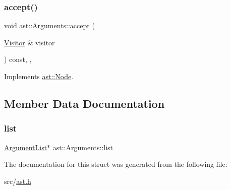 \subsubsection{\texorpdfstring{accept()}{accept()}}
{\footnotesize\ttfamily void ast\+::\+Arguments\+::accept (\begin{DoxyParamCaption}\item[{\hyperlink{structast_1_1_visitor}{Visitor} \&}]{visitor }\end{DoxyParamCaption}) const\hspace{0.3cm}{\ttfamily [inline]}, {\ttfamily [override]}, {\ttfamily [virtual]}}



Implements \hyperlink{structast_1_1_node_abc089ee6caaf06a4445ebdd8391fdebc}{ast\+::\+Node}.



\subsection{Member Data Documentation}
\mbox{\label{structast_1_1_arguments_ab37e8d216047d6b1cdbc7eee2b1bb2db}} 
\subsubsection{\texorpdfstring{list}{list}}
{\footnotesize\ttfamily \hyperlink{structast_1_1_argument_list}{Argument\+List}$\ast$ ast\+::\+Arguments\+::list}



The documentation for this struct was generated from the following file\+:\begin{DoxyCompactItemize}
\item 
src/\hyperlink{ast_8h}{ast.\+h}\end{DoxyCompactItemize}

